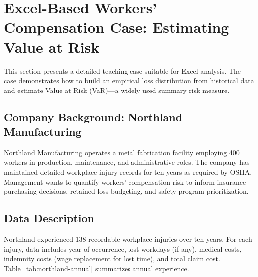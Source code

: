 \documentclass[11pt,openany]{book}
\begin{document}
\section{Excel-Based Workers' Compensation Case: Estimating Value at Risk}
\label{sec:northland-var}

This section presents a detailed teaching case suitable for Excel analysis.
The case demonstrates how to build an empirical loss distribution from
historical data and estimate Value at Risk (VaR)---a widely used summary risk
measure.

\subsection{Company Background: Northland Manufacturing}
\label{subsec:northland-background}

Northland Manufacturing operates a metal fabrication facility employing
400 workers in production, maintenance, and administrative roles. The company
has maintained detailed workplace injury records for ten years as required by
OSHA. Management wants to quantify workers' compensation risk to inform
insurance purchasing decisions, retained loss budgeting, and safety program
prioritization.

\subsection{Data Description}
\label{subsec:northland-data}

Northland experienced 138 recordable workplace injuries over ten years. For
each injury, data includes year of occurrence, lost workdays (if any), medical
costs, indemnity costs (wage replacement for lost time), and total claim cost.
Table~\ref{tab:northland-annual} summarizes annual experience.
\end{document}
